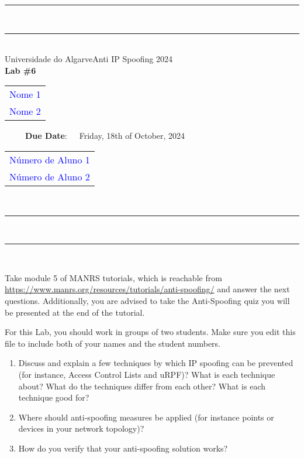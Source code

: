\documentclass{article} %
\begin{document}
\begin{center}
\rule{\textwidth}{.0075in} \\
\rule[3mm]{\textwidth}{.0075in}\\

Universidade do Algarve\hfill Anti IP Spoofing \hfill 2024\\[3ex]

{\Large\bf Lab \#6} \\[3ex]

\begin{tabular}{l}
\textcolor{blue}{Nome 1} \\ \hfill 
\textcolor{blue}{Nome 2} \hfill
\end{tabular}
 ~~~~~\textbf{Due Date}:~~~Friday, 18th of October, 2024 \hfill 
\begin{tabular}{l}
\textcolor{blue}{Número de Aluno 1} \\ \hfill 
\textcolor{blue}{Número de Aluno 2} \hfill
\end{tabular}\\

\rule{\textwidth}{.0075in} \\
\rule[3mm]{\textwidth}{.0075in} \\
\end{center}


Take module 5 of MANRS tutorials, which is reachable from 
\href{https://www.manrs.org/resources/tutorials/anti-spoofing/}{https://\-www.manrs.org/\-resources/\-tutorials/\-anti-\-spoofing/}
and answer the next questions. Additionally, you are advised to take the Anti-Spoofing quiz you
will be presented at the end of the tutorial.

For this Lab, you should work in groups of two students. Make sure you edit this file to include
both of your names and the student numbers.


\begin{enumerate}
\item Discuss and explain a few techniques by which IP spoofing can be prevented (for instance,
  Access Control Lists and uRPF)? What is each technique about? What do the techniques differ from
  each other? What is each technique good for?
\item Where should anti-spoofing measures be applied
  (for instance points or devices in your network topology)?
\item How do you verify that your anti-spoofing solution works?
\end{enumerate}  
\end{document}
